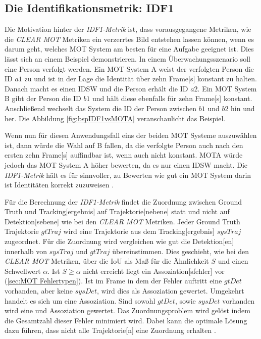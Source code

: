 \subsection{Die Identifikationsmetrik: IDF1}
Die Motivation hinter der \textit{\gls{IDF1}-Metrik} ist, dass vorausgegangene Metriken, wie die \textit{\acrshort{CLEAR} \gls{MOT}} Metriken ein verzerrtes Bild entstehen lassen können, wenn es darum geht, welches \gls{MOT} System am besten für eine Aufgabe geeignet ist. Dies lässt sich an einem Beispiel demonstrieren. In einem Überwachungsszenario soll eine Person verfolgt werden. Ein \gls{MOT} System A weist der verfolgten Person die \acrshort{ID} \(a1\) zu und ist in der Lage die Identität über zehn \gls{Frame}[s] konstant zu halten. Danach macht es einen \gls{IDSW} und die Person erhält die \acrshort{ID} \(a2\). Ein \gls{MOT} System B gibt der Person die \acrshort{ID} \(b1\) und hält diese ebenfalls für zehn \gls{Frame}[s] konstant. Anschließend wechselt das System die \acrshort{ID} der Person zwischen \(b1\) und \(b2\) hin und her. Die Abbildung \ref{fig:bspIDF1vsMOTA} veranschaulicht das Beispiel.


Wenn nun für diesen Anwendungsfall eins der beiden \gls{MOT} Systeme auszuwählen ist, dann würde die Wahl auf B fallen, da die verfolgte Person auch nach den ersten zehn \gls{Frame}[s] auffindbar ist, wenn auch nicht konstant. \gls{MOTA} würde jedoch das \gls{MOT} System A höher bewerten, da es nur einen \gls{IDSW} macht. Die \textit{\gls{IDF1}-Metrik} hält es für sinnvoller, zu Bewerten wie gut ein \gls{MOT} System darin ist Identitäten korrekt zuzuweisen \cite{IDF1}. \par

Für die Berechnung der \textit{\gls{IDF1}-Metrik} findet die Zuordnung zwischen \gls{Ground Truth} und \gls{Tracking}[ergebnis] auf \gls{Trajektorie}[nebene] statt und nicht auf \gls{Detektion}[sebene] wie bei den \textit{\acrshort{CLEAR} \gls{MOT}} Metriken. Jeder \gls{Ground Truth} \gls{Trajektorie} \(gtTraj\) wird eine \gls{Trajektorie} aus dem \gls{Tracking}[ergebnis] \(sysTraj\) zugeordnet. Für die Zuordnung wird vergleichen wie gut die \gls{Detektion}[en] innerhalb von \(sysTraj\) und \(gtTraj\) übereinstimmen. Dies geschieht, wie bei den \textit{\acrshort{CLEAR} \gls{MOT}} Metriken, über die \gls{IoU} als Maß für die Ähnlichkeit \(S\) und einen Schwellwert \(\alpha\). Ist \(S \geq \alpha\) nicht erreicht liegt ein \gls{Assoziation}[sfehler] vor (\ref{sec:MOT Fehlertypen}). Ist im \gls{Frame} in dem der Fehler auftritt eine \(gtDet\) vorhanden, aber keine \(sysDet\), wird dies als  \gls{Assoziation} gewertet. Umgekehrt handelt es sich um eine  \gls{Assoziation}. Sind sowohl \(gtDet\), sowie \(sysDet\) vorhanden wird eine  und  \gls{Assoziation} gewertet. Das Zuordnungsproblem wird gelöst indem die Gesamtzahl dieser Fehler minimiert wird. Dabei kann die optimale Lösung dazu führen, dass nicht alle \gls{Trajektorie}[n] eine Zuordnung erhalten \cite{IDF1}. \par

